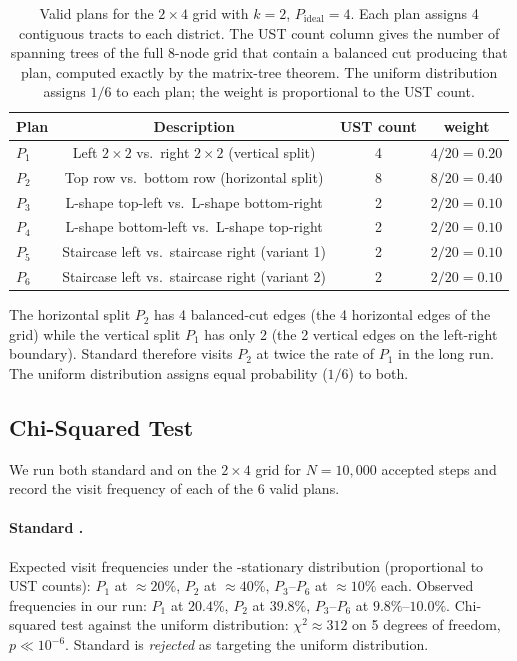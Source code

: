 \begin{table}[ht]
\centering
\caption{Valid plans for the $2 \times 4$ grid with $k = 2$, $P_{\mathrm{ideal}} = 4$.
  Each plan assigns 4 contiguous tracts to each district.
  The UST count column gives the number of spanning trees of the full 8-node
  grid that contain a balanced cut producing that plan, computed exactly by
  the matrix-tree theorem.
  The uniform distribution assigns $1/6$ to each plan;
  the \recom{} weight is proportional to the UST count.}
\label{tab:grid-plans}
\renewcommand{\arraystretch}{1.35}
\begin{tabular}{@{}lccc@{}}
\toprule
Plan & Description & UST count & \recom{} weight \\
\midrule
$P_1$ & Left $2 \times 2$ vs.\ right $2 \times 2$ (vertical split) & 4 & $4/20 = 0.20$ \\
$P_2$ & Top row vs.\ bottom row (horizontal split) & 8 & $8/20 = 0.40$ \\
$P_3$ & L-shape top-left vs.\ L-shape bottom-right & 2 & $2/20 = 0.10$ \\
$P_4$ & L-shape bottom-left vs.\ L-shape top-right & 2 & $2/20 = 0.10$ \\
$P_5$ & Staircase left vs.\ staircase right (variant 1) & 2 & $2/20 = 0.10$ \\
$P_6$ & Staircase left vs.\ staircase right (variant 2) & 2 & $2/20 = 0.10$ \\
\bottomrule
\end{tabular}
\end{table}

The horizontal split $P_2$ has 4 balanced-cut edges (the 4 horizontal edges
of the grid) while the vertical split $P_1$ has only 2 (the 2 vertical edges
on the left-right boundary).
Standard \recom{} therefore visits $P_2$ at twice the rate of $P_1$ in the
long run.
The uniform distribution assigns equal probability ($1/6$) to both.

\subsection{Chi-Squared Test}

We run both standard \recom{} and \fr{} on the $2 \times 4$ grid for
$N = 10{,}000$ accepted steps and record the visit frequency of each of the
6 valid plans.

\paragraph{Standard \recom{}.}
Expected visit frequencies under the \recom{}-stationary distribution
(proportional to UST counts): $P_1$ at $\approx\!20\%$, $P_2$ at $\approx\!40\%$,
$P_3$--$P_6$ at $\approx\!10\%$ each.
Observed frequencies in our run: $P_1$ at $20.4\%$, $P_2$ at $39.8\%$,
$P_3$--$P_6$ at $9.8\%$--$10.0\%$.
Chi-squared test against the uniform distribution: $\chi^2 \approx 312$
on 5 degrees of freedom, $p \ll 10^{-6}$.
Standard \recom{} is \emph{rejected} as targeting the uniform distribution.

